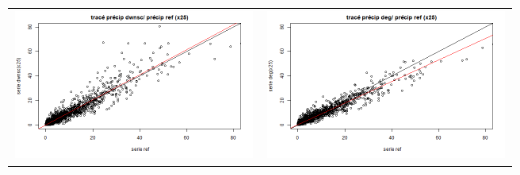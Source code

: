 \documentclass[a4paper,11pt]{article}
\begin{document}
\begin{tabular}{cc}
	\includegraphics[scale=0.4]{images/pr_2_ds.png} & \includegraphics[scale=0.4]{images/pr_2_dg.png}  \\
\end{tabular}
\end{document}
